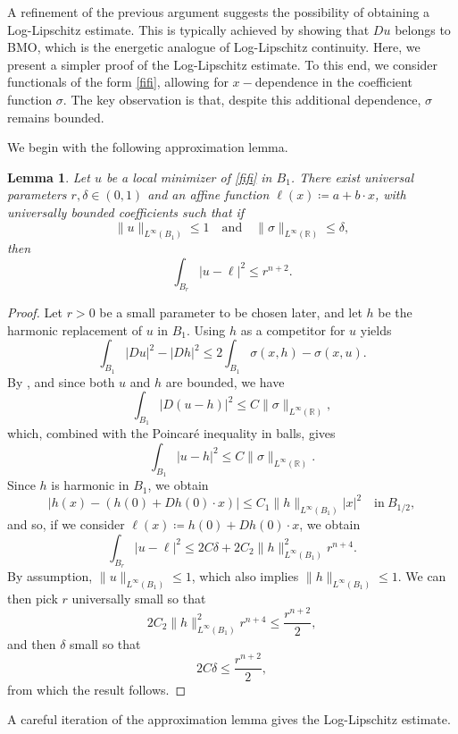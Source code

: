 \documentclass[reqno,11pt]{amsart}
\newtheorem{lemma}{Lemma}[section]
\newcommand{\1}{\mathds{1}}  %
\numberwithin{equation}{section}
\begin{document}
A refinement of the previous argument suggests the possibility of obtaining a Log-Lipschitz estimate. This is typically achieved by showing that $Du$ belongs to BMO, which is the energetic analogue of Log-Lipschitz continuity. Here, we present a simpler proof of the Log-Lipschitz estimate. To this end, we consider functionals of the form \eqref{fifi}, allowing for $x-$dependence in the coefficient function $\sigma$. The key observation is that, despite this additional dependence, $\sigma$ remains bounded.

We begin with the following approximation lemma.

\begin{lemma}\label{flatland log lip}
Let $u$ be a local minimizer of \eqref{fifi} in $B_1$. There exist universal parameters $r, \delta \in (0,1)$ and an affine function $\ell(x) \coloneqq a + b \cdot x$, with universally bounded coefficients such that if 
$$
    \|u\|_{L^\infty(B_1)} \leq 1 \quad \text{and} \quad \|\sigma\|_{L^\infty(\mathbb{R})} \leq \delta,
$$
then
$$
    \int_{B_r}|u - \ell|^2 \leq r^{n+2}.
$$
\end{lemma}

\begin{proof}
Let $r>0$ be a small parameter to be chosen later, and let $h$ be the harmonic replacement of $u$ in $B_1$. Using $h$ as a competitor for $u$ yields
$$
  \int_{B_1}|Du|^2 - |Dh|^2 \leq 2\int_{B_1}\sigma(x,h) - \sigma(x,u).  
$$
By , and since both $u$ and $h$ are bounded, we have
$$
    \int_{B_1}|D(u-h)|^2 \leq C\|\sigma\|_{L^\infty(\mathbb{R})},
$$
which, combined with the Poincar\'e inequality in balls, gives
$$
    \int_{B_1}|u-h|^2 \leq C\|\sigma\|_{L^\infty(\mathbb{R})}.
$$
Since $h$ is harmonic in $B_1$, we obtain
$$
    |h(x) - (h(0) + Dh(0)\cdot x)| \leq C_1 \|h\|_{L^\infty(B_1)} |x|^2 \quad \text{in} \ B_{1/2},
$$
and so, if we consider $\ell(x) \coloneqq h(0) + Dh(0) \cdot x$, we obtain
$$
    \int_{B_r}|u-\ell|^2 \leq 2C\delta + 2C_2 \|h\|^2_{L^\infty(B_1)} r^{n+4}.
$$
By assumption, $\|u\|_{L^\infty(B_1)} \leq 1$, which also implies $\|h\|_{L^\infty(B_1)} \leq 1$. We can then pick $r$ universally small so that
$$
    2C_2 \|h\|^2_{L^\infty(B_1)} r^{n+4} \leq \frac{r^{n+2}}{2},
$$
and then $\delta$ small so that
$$
    2C \delta \leq \frac{r^{n+2}}{2},
$$
from which the result follows.
\end{proof}

A careful iteration of the approximation lemma gives the Log-Lipschitz estimate.
\end{document}
